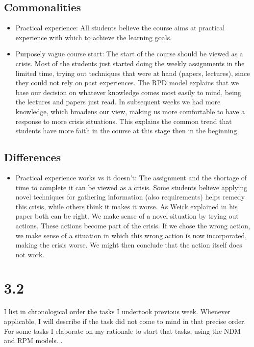 \subsection{Commonalities}
\begin{itemize}
	\item Practical experience: All students believe the course aims at practical experience with which to achieve the learning goals. 
	\item Purposely vague course start: The start of the course should be viewed as a crisis. Most of the students just started doing the weekly assignments in the limited time, trying out techniques that were at hand (papers, lectures), since they could not rely on past experiences. The RPD model \cite{ndm} explains that we base our decision on whatever knowledge comes most easily to mind, being the lectures and papers just read. In subsequent weeks we had more knowledge, which broadens our view, making us more comfortable to have a response to more crisis situations. This explains the common trend that students have more faith in the course at this stage then in the beginning.  
\end{itemize}

\subsection{Differences}
	\begin{itemize}
		\item Practical experience works vs it doesn't: The assignment and the shortage of time to complete it can be viewed as a crisis. Some students believe applying novel techniques for gathering information (also requirements) helps remedy this crisis, while others think it makes it worse. As Weick explained in his paper both can be right. We make sense of a novel situation by trying out actions. These actions become part of the crisis. If we chose the wrong action, we make sense of a situation in which this wrong action is now incorporated, making the crisis worse. We might then conclude that the action itself does not work.
	\end{itemize}


\section*{3.2}
I list in chronological order the tasks I undertook previous week. Whenever applicable, I will describe if the task did not come to mind in that precise order. For some tasks I elaborate on my rationale to start that tasks, using the NDM and RPM models. \cite{ndm}. \\


